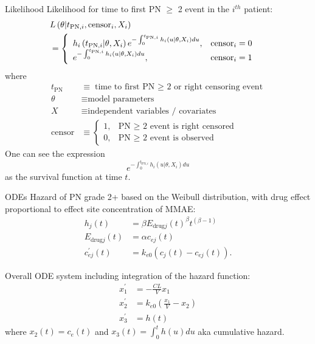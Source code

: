 \documentclass[presentation, allowframebreaks]{beamer}
\begin{document}
\begin{frame}[label={sec:org37bed30}]{Likelihood}
Likelihood for time to first PN \(\ge\) 2 event in the \(i^{th}\) patient:
\begin{align*}
\lefteqn{L\left(\theta | t_{\text{PN},i}, \text{censor}_i, X_i\right)} \\
  &= \left\{ \begin{array}{ll}
     h_i\left(t_{\text{PN},i} | \theta, X_i\right) e^{-\int_0^{t_{\text{PN},i}} h_i\left(u | \theta, X_i\right) du}, &
    \text{censor}_i = 0 \\
     e^{-\int_0^{t_{\text{PN},i}} h_i\left(u | \theta, X_i\right) du}, &
     \text{censor}_i = 1
\end{array} \right.
\end{align*}
where
 \begin{align*}
   t_{\text{PN}} &\equiv \text{time to first PN $\ge$ 2 or right
     censoring event} \\
 \theta &\equiv \text{model parameters} \\
 X &\equiv \text{independent variables / covariates} \\
 \text{censor} &\equiv \left\{ \begin{array}{ll}
     1, & \text{PN $\ge$ 2 event is right censored} \\
     0, & \text{PN $\ge$ 2 event is observed} 
 \end{array} \right.
\end{align*}
One can see the expression
\begin{equation*}
  e^{-\int_0^{t_{\text{PN},i}} h_i\left(u | \theta, X_i\right) du}
\end{equation*}
as the survival function at time \(t\).
\end{frame}

\begin{frame}[label={sec:org8d4255a}]{ODEs}
Hazard of PN grade 2+ based on the Weibull distribution,
with drug effect proportional to effect site concentration of MMAE:
\begin{align*}
  h_j(t) &= \beta E_{\text{drug}j}(t)^\beta t^{(\beta - 1)} \\
  E_{\text{drug}j}(t) &= \alpha c_{ej}(t) \\
  c^\prime_{ej}(t) &= k_{e0} \left(c_j(t) - c_{ej}(t)\right).
\end{align*}

Overall ODE system including integration of the hazard function:
\begin{align}
  x_1^\prime &= -\frac{CL}{V} x_1 \\
  x_2^\prime &= k_{e0} \left(\frac{x_1}{V} - x_2\right) \\
  x_3^\prime &= h(t)
  \end{align}
where \(x_2(t) = c_e(t)\) and \(x_3(t) = \int_0^t h(u) du\) aka cumulative hazard.
\end{frame}
\end{document}
